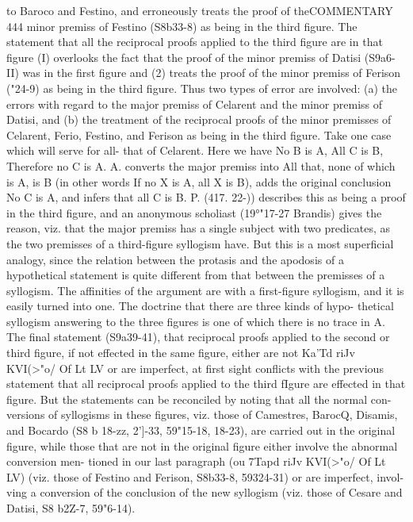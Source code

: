 {{to Baroco and Festino, and erroneously treats the proof of theCOMMENTARY
444
minor premiss of Festino (S8b33-8) as being in the third figure.
The statement that all the reciprocal proofs applied to the third
figure are in that figure (I) overlooks the fact that the proof of the
minor premiss of Datisi (S9a6-II) was in the first figure and (2)
treats the proof of the minor premiss of Ferison ("24-9) as being
in the third figure. Thus two types of error are involved: (a) the
errors with regard to the major premiss of Celarent and the minor
premiss of Datisi, and (b) the treatment of the reciprocal proofs of
the minor premisses of Celarent, Ferio, Festino, and Ferison as
being in the third figure. Take one case which will serve for all-
that of Celarent. Here we have No B is A, All C is B, Therefore
no C is A. A. converts the major premiss into All that, none of
which is A, is B (in other words If no X is A, all X is B), adds the
original conclusion No C is A, and infers that all C is B. P. (417.
22-{)) describes this as being a proof in the third figure, and an
anonymous scholiast (19°"17-27 Brandis) gives the reason, viz.
that the major premiss has a single subject with two predicates,
as the two premisses of a third-figure syllogism have. But this is
a most superficial analogy, since the relation between the protasis
and the apodosis of a hypothetical statement is quite different
from that between the premisses of a syllogism. The affinities of
the argument are with a first-figure syllogism, and it is easily
turned into one. The doctrine that there are three kinds of hypo-
thetical syllogism answering to the three figures is one of which
there is no trace in A.
The final statement (S9a39-41), that reciprocal proofs applied
to the second or third figure, if not effected in the same figure,
either are not Ka'Td riJv KVI(>"o/ Of Lt LV or are imperfect, at first sight
conflicts with the previous statement that all reciprocal proofs
applied to the third fIgure are effected in that figure. But the
statements can be reconciled by noting that all the normal con-
versions of syllogisms in these figures, viz. those of Camestres,
BarocQ, Disamis, and Bocardo (S8 b 18-zz, 2']-33, 59"15-18, 18-23),
are carried out in the original figure, while those that are not in
the original figure either involve the abnormal conversion men-
tioned in our last paragraph (ou 7Tapd riJv KVI(>"o/ Of Lt LV) (viz. those
of Festino and Ferison, S8b33-8, 59324-31) or are imperfect, invol-
ving a conversion of the conclusion of the new syllogism (viz.
those of Cesare and Datisi, S8 b2Z-7, 59"6-14).
}}}
